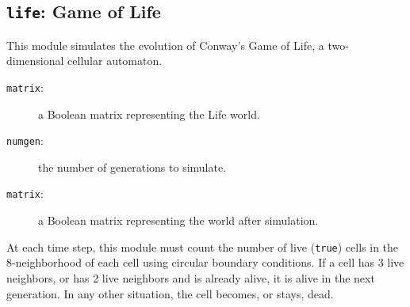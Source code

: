 \subsection{{\tt{life}}: Game of Life\label{s:toys-life}}

This module simulates the evolution of Conway's Game of Life,
a two-dimensional cellular automaton.

{}

\begin{description}
\item[{\tt{matrix}}:]
	a Boolean matrix representing the Life world.
\item[{\tt{numgen}}:]
	the number of generations to simulate.
\end{description}

{\outputspec}

\begin{description}
\item[{\tt{matrix}}:]
	a Boolean matrix representing the world after simulation.
\end{description}

At each time step,
this module must count the number of live ({\tt{true}}) cells in the 8-neighborhood of each cell
using circular boundary conditions.
If a cell has 3 live neighbors,
or has 2 live neighbors and is already alive,
it is alive in the next generation.
In any other situation,
the cell becomes, or stays, dead.

